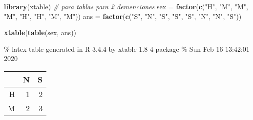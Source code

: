 \documentclass[]{article}
\newenvironment{Shaded}{\begin{snugshade}}{\end{snugshade}}
\newcommand{\CommentTok}[1]{\textcolor[rgb]{0.56,0.35,0.01}{\textit{#1}}}
\newcommand{\KeywordTok}[1]{\textcolor[rgb]{0.13,0.29,0.53}{\textbf{#1}}}
\newcommand{\NormalTok}[1]{#1}
\newcommand{\StringTok}[1]{\textcolor[rgb]{0.31,0.60,0.02}{#1}}
\begin{document}
\begin{Shaded}
\begin{Highlighting}[]
\KeywordTok{library}\NormalTok{(xtable) }\CommentTok{# para tablas para  2 demenciones}
\NormalTok{sex =}\StringTok{ }\KeywordTok{factor}\NormalTok{(}\KeywordTok{c}\NormalTok{(}\StringTok{"H"}\NormalTok{, }\StringTok{"M"}\NormalTok{, }\StringTok{"M"}\NormalTok{, }\StringTok{"M"}\NormalTok{, }\StringTok{"H"}\NormalTok{, }\StringTok{"H"}\NormalTok{, }\StringTok{"M"}\NormalTok{, }\StringTok{"M"}\NormalTok{))}
\NormalTok{ans =}\StringTok{ }\KeywordTok{factor}\NormalTok{(}\KeywordTok{c}\NormalTok{(}\StringTok{"S"}\NormalTok{, }\StringTok{"N"}\NormalTok{, }\StringTok{"S"}\NormalTok{, }\StringTok{"S"}\NormalTok{, }\StringTok{"S"}\NormalTok{, }\StringTok{"N"}\NormalTok{, }\StringTok{"N"}\NormalTok{, }\StringTok{"S"}\NormalTok{))}

\KeywordTok{xtable}\NormalTok{(}\KeywordTok{table}\NormalTok{(sex, ans))}
\end{Highlighting}
\end{Shaded}

\% latex table generated in R 3.4.4 by xtable 1.8-4 package \% Sun Feb
16 13:42:01 2020

\begin{table}[ht]
\centering
\begin{tabular}{rrr}
  \hline
 & N & S \\ 
  \hline
H &   1 &   2 \\ 
  M &   2 &   3 \\ 
   \hline
\end{tabular}
\end{table}
\end{document}
